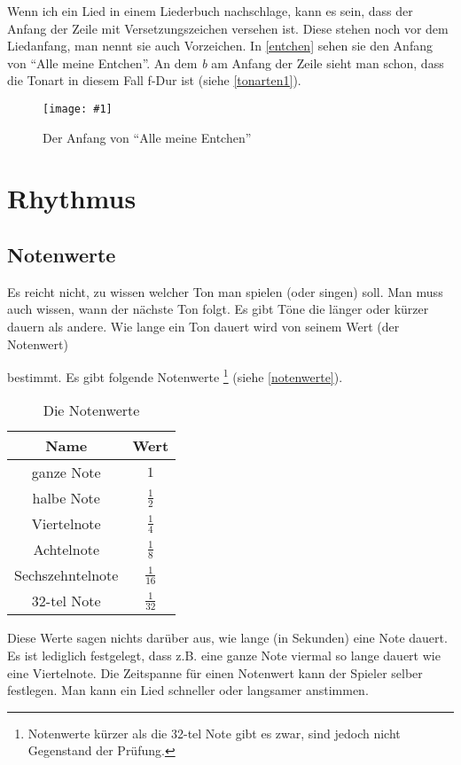 \documentclass[10pt,a4paper,twoside]{report}
\newcommand{\comment}[1]{
	\marginpar{
		\textsf{#1}
	}
}
\newcommand{\image}[4]{
	\begin{figure}[!ht]
		\centering
		\texttt{[image: \#1]}
		\caption{#2}
		\label{#3}
	\end{figure}
}
\begin{document}
Wenn ich ein Lied in einem Liederbuch nachschlage, kann es sein, dass der Anfang der Zeile
mit Versetzungszeichen versehen ist. Diese stehen noch vor dem Liedanfang, man nennt sie auch
Vorzeichen.\comment{Vorzeichen} In \autoref{entchen}  sehen sie den Anfang von "`Alle meine Entchen"'. 
An dem \emph{b} am Anfang der Zeile sieht man schon, dass die Tonart in diesem Fall f-Dur ist 
(siehe \autoref{tonarten1}).

\image{lilypond/allemeineentchen.png}{Der Anfang von "`Alle meine Entchen"'}{entchen}{12}

\chapter{Rhythmus}
\section{Notenwerte}
Es reicht nicht, zu wissen welcher Ton man spielen (oder singen) soll. Man
muss auch wissen, wann der nächste Ton folgt. Es gibt Töne die 
länger oder kürzer
dauern als andere. Wie lange ein Ton dauert 
wird von seinem Wert (der Notenwert)\comment{Notenwert $\rightarrow$ Dauer}
bestimmt. Es gibt folgende Notenwerte%
\footnote{Notenwerte 
kürzer als die 32-tel Note gibt es zwar, sind jedoch 
nicht Gegenstand der Prüfung.}
(siehe \autoref{notenwerte}).
\begin{table}[!ht]
	\centering
	\begin{tabular}{|c|c|}
	\hline \textbf{Name} & \textbf{Wert} \\
	\hline ganze Note & $1$ \\ 
	\hline halbe Note & $\frac{1}{2}$ \\ 
	\hline Viertelnote & $\frac{1}{4}$ \\ 
	\hline Achtelnote & $ \frac{1}{8} $ \\ 
	\hline Sechszehntelnote & $ \frac{1}{16} $ \\ 
	\hline 32-tel Note & $ \frac{1}{32} $ \\ 
	\hline 
	\end{tabular} 
	\caption{Die Notenwerte}
	\label{notenwerte}
\end{table}
Diese Werte sagen nichts darüber aus, wie lange (in Sekunden) eine Note dauert. 
Es ist lediglich festgelegt, dass z.B. eine ganze Note 
viermal so lange dauert wie eine
Viertelnote. Die Zeitspanne für einen Notenwert kann der Spieler selber 
festlegen. Man kann ein Lied schneller oder langsamer anstimmen.
\end{document}
